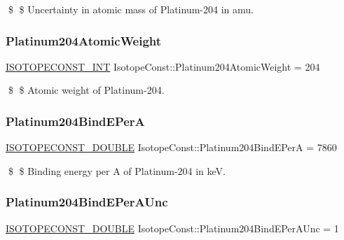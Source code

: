 \$ \$ Uncertainty in atomic mass of Platinum-\/204 in amu. \mbox{\label{group___isotope_const-_platinum-_pt204_ga24b7c7b2c72e4bb507fc9652a4420faa}} 
\subsubsection{\texorpdfstring{Platinum204\+Atomic\+Weight}{Platinum204AtomicWeight}}
{\footnotesize\ttfamily \mbox{\hyperlink{group___isotope_const-_macros_ga5f18360b3e99483a35c32d789e62621c}{I\+S\+O\+T\+O\+P\+E\+C\+O\+N\+S\+T\+\_\+\+I\+NT}} Isotope\+Const\+::\+Platinum204\+Atomic\+Weight = 204}

\$ \$ Atomic weight of Platinum-\/204. \mbox{\label{group___isotope_const-_platinum-_pt204_ga6bb334cd488690ff3081e18a084638d3}} 
\subsubsection{\texorpdfstring{Platinum204\+Bind\+E\+PerA}{Platinum204BindEPerA}}
{\footnotesize\ttfamily \mbox{\hyperlink{group___isotope_const-_macros_ga8f45a7272ce02c0b4c65c44636ed719a}{I\+S\+O\+T\+O\+P\+E\+C\+O\+N\+S\+T\+\_\+\+D\+O\+U\+B\+LE}} Isotope\+Const\+::\+Platinum204\+Bind\+E\+PerA = 7860}

\$ \$ Binding energy per A of Platinum-\/204 in keV. \mbox{\label{group___isotope_const-_platinum-_pt204_ga96ada28a36190435e2e5801086b58fe8}} 
\subsubsection{\texorpdfstring{Platinum204\+Bind\+E\+Per\+A\+Unc}{Platinum204BindEPerAUnc}}
{\footnotesize\ttfamily \mbox{\hyperlink{group___isotope_const-_macros_ga8f45a7272ce02c0b4c65c44636ed719a}{I\+S\+O\+T\+O\+P\+E\+C\+O\+N\+S\+T\+\_\+\+D\+O\+U\+B\+LE}} Isotope\+Const\+::\+Platinum204\+Bind\+E\+Per\+A\+Unc = 1}

